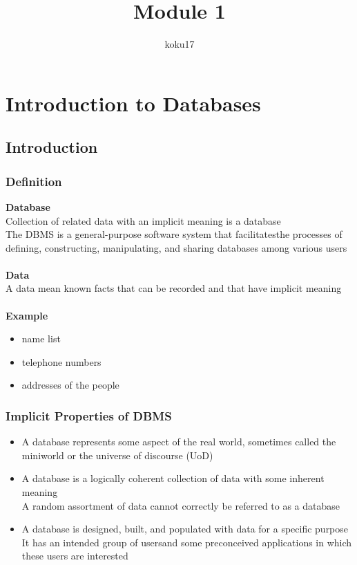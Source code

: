 \documentclass{article}
\title{Module 1}
\author{koku17}
\begin{document}
	\maketitle \thispagestyle{empty} \newpage
	\tableofcontents \thispagestyle{empty} \newpage
	\section{Introduction to Databases}
	\subsection{Introduction}
	\subsubsection{Definition}
	\textbf{Database} \\
	Collection of related data with an implicit meaning is a database \\
	The DBMS is a general-purpose software system that facilitatesthe processes of defining, constructing,
	manipulating, and sharing databases among various users \\ \null \\
	\textbf{Data} \\
	A data mean known facts that can be recorded and that have implicit meaning \\ \null \\
	\textbf{Example}
	\begin{itemize}[label=]
		\item name list
		\item telephone numbers
		\item addresses of the people
	\end{itemize}

	\subsubsection{Implicit Properties of DBMS}
	\begin{itemize}
		\item A database represents some aspect of the real world, sometimes called the miniworld or
			the universe of discourse (UoD)
		\item A database is a logically coherent collection of data with some inherent meaning \\
			A random assortment of data cannot correctly be referred to as a database
		\item A database is designed, built, and populated with data for a specific purpose \\
			It has an intended group of usersand some preconceived applications in which these users
			are interested
	\end{itemize}
\end{document}

